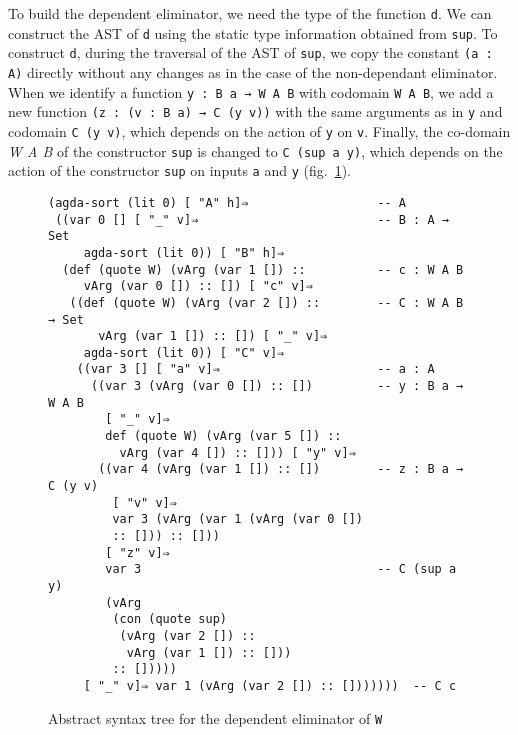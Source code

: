 \documentclass[sigplan,10pt]{acmart}
\begin{document}
To build the dependent eliminator, we need the type of the function {\tt d}. We can construct the AST of {\tt d} using the static type information obtained from {\tt sup}. To construct {\tt d}, during the traversal of the AST of {\tt sup}, we copy the constant {\tt (a : A)} directly without any changes as in the case of the non-dependant eliminator. When we identify a function {\tt y : B a → W A B} with codomain {\tt W A B}, we add a new function {\tt (z : (v : B a) → C (y v))} with the same arguments as in {\tt y} and codomain {\tt C (y v)}, which depends on the action of {\tt y} on {\tt v}. Finally, the co-domain \emph{W A B} of the constructor {\tt sup} is changed to {\tt C (sup a y)}, which depends on the action of the constructor {\tt sup} on inputs {\tt a} and {\tt y} (fig.~\ref{fig:ast-d'}).

\begin{figure}
\begin{center}
\begingroup
\fontsize{7pt}{9pt}\selectfont
\begin{Verbatim}
(agda-sort (lit 0) [ "A" h]⇒                  -- A
 ((var 0 [] [ "_" v]⇒                         -- B : A → Set
     agda-sort (lit 0)) [ "B" h]⇒
  (def (quote W) (vArg (var 1 []) ::          -- c : W A B
     vArg (var 0 []) :: []) [ "c" v]⇒
   ((def (quote W) (vArg (var 2 []) ::        -- C : W A B → Set
       vArg (var 1 []) :: []) [ "_" v]⇒
     agda-sort (lit 0)) [ "C" v]⇒
    ((var 3 [] [ "a" v]⇒                      -- a : A
      ((var 3 (vArg (var 0 []) :: [])         -- y : B a → W A B
        [ "_" v]⇒
        def (quote W) (vArg (var 5 []) :: 
          vArg (var 4 []) :: [])) [ "y" v]⇒
       ((var 4 (vArg (var 1 []) :: [])        -- z : B a → C (y v)
         [ "v" v]⇒
         var 3 (vArg (var 1 (vArg (var 0 []) 
         :: [])) :: []))
        [ "z" v]⇒
        var 3                                 -- C (sup a y)
        (vArg
         (con (quote sup)
          (vArg (var 2 []) :: 
           vArg (var 1 []) :: []))
         :: []))))
     [ "_" v]⇒ var 1 (vArg (var 2 []) :: []))))))  -- C c
\end{Verbatim}
\endgroup
\end{center}
\caption{Abstract syntax tree for the dependent eliminator of {\tt W}}
\label{fig:ast-d'}
\end{figure}
\normalsize
\end{document}
